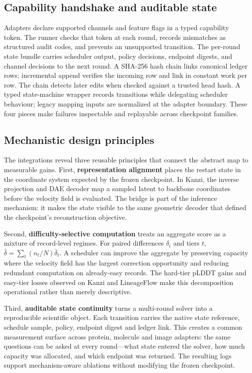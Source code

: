 \documentclass[journal,twocolumn,final]{IEEEtran}
\begin{document}
\subsection{Capability handshake and auditable state}
Adapters declare supported channels and feature flags in a typed capability token. The runner checks that token at each round, records mismatches as structured audit codes, and prevents an unsupported transition. The per-round state bundle carries scheduler output, policy decisions, endpoint digests, and channel decisions to the next round. A SHA-256 hash chain links canonical ledger rows; incremental append verifies the incoming row and link in constant work per row. The chain detects later edits when checked against a trusted head hash. A typed state-machine wrapper records transitions while delegating scheduler behaviour; legacy mapping inputs are normalized at the adapter boundary. These four pieces make failures inspectable and replayable across checkpoint families.

\subsection{Mechanistic design principles}
The integrations reveal three reusable principles that connect the abstract map to measurable gains. First, \textbf{representation alignment} places the restart state in the coordinate system expected by the frozen checkpoint. In Kanzi, the inverse projection and DAE decoder map a sampled latent to backbone coordinates before the velocity field is evaluated. The bridge is part of the inference mechanism: it makes the state visible to the same geometric decoder that defined the checkpoint's reconstruction objective.

Second, \textbf{difficulty-selective computation} treats an aggregate score as a mixture of record-level regimes. For paired differences $\delta_i$ and tiers $t$, $\bar{\delta}=\sum_t(n_t/N)\bar{\delta}_t$. A scheduler can improve the aggregate by preserving capacity where the velocity field has the largest correction opportunity and reducing redundant computation on already-easy records. The hard-tier pLDDT gains and easy-tier losses observed on Kanzi and LineageFlow make this decomposition operational rather than merely descriptive.

Third, \textbf{auditable state continuity} turns a multi-round solver into a reproducible scientific object. Each transition carries the native state reference, schedule sample, policy, endpoint digest and ledger link. This creates a common measurement surface across protein, molecule and image adapters: the same questions can be asked at every round---what state entered the solver, how much capacity was allocated, and which endpoint was returned. The resulting logs support mechanism-aware ablations without modifying the frozen checkpoint.
\end{document}
